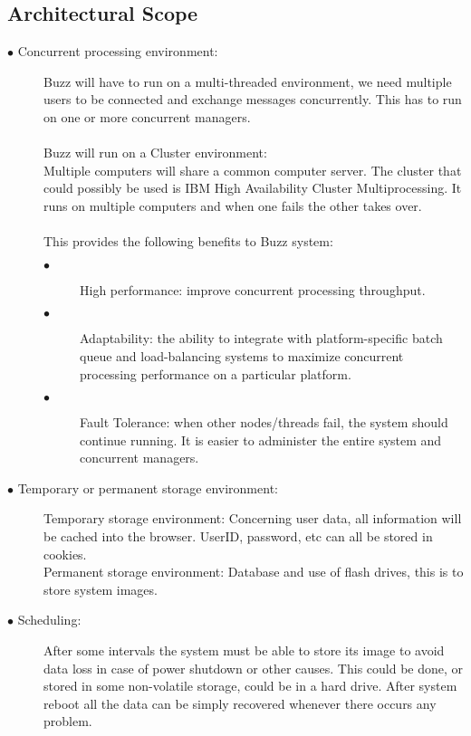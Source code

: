 \documentclass[hidelinks, 12pt]{article}
\begin{document}
\subsection{Architectural Scope}
\begin{description}
\item[$\bullet$ Concurrent processing environment:]

Buzz will have to run on a multi-threaded environment, we need multiple users to be connected and exchange messages concurrently. This has to run on one or more concurrent managers.\\\\
Buzz will run on a Cluster environment:\\
Multiple computers will share a common computer server. The cluster that could possibly be used is IBM High Availability Cluster Multiprocessing. It runs on multiple computers and when one fails the other takes over.\\\\
This provides the following benefits to Buzz system:
\begin{description}
\item[$\bullet$] High performance: improve concurrent processing throughput.
\item[$\bullet$]Adaptability: the ability to integrate with platform-specific batch queue and load-balancing systems to maximize concurrent processing performance on a particular platform.
\item[$\bullet$] Fault Tolerance: when other nodes/threads fail, the system should continue running. It is easier to administer the entire system and concurrent managers.\\
\end{description}

\item[$\bullet$ Temporary or permanent storage environment:]

Temporary storage environment: Concerning user data, all information will be cached into the browser. UserID, password, etc can all be stored in cookies.\\
Permanent storage environment: Database and use of flash drives, this is to store system images.\\

\item[$\bullet$ Scheduling:]

After some intervals the system must be able to store its image to avoid data loss in case of power shutdown or other causes. This could be done, or stored in some non-volatile storage, could be in a hard drive. After system reboot all the data can be simply recovered whenever there occurs any problem.\\


\end{description}
\end{document}
